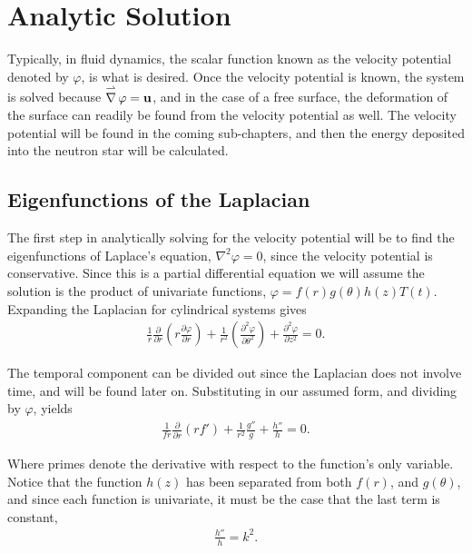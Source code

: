 \documentclass[12pt]{article}
\DeclareMathOperator{\grad}{\overset{\rightharpoonup}\nabla}
\begin{document}
\doublespacing
\linespread{2}

\section{Analytic Solution}

Typically, in fluid dynamics, the scalar function known as the velocity potential denoted by $\varphi$, is what is desired. Once the velocity potential is known, the system is solved because  $\grad \varphi = \bf{u}$, and in the case of a free surface, the deformation of the surface can readily be found from the velocity potential as well. The velocity potential will be found in the coming sub-chapters, and then the energy deposited into the neutron star will be calculated.

\subsection{Eigenfunctions of the Laplacian}

The first step in analytically solving for the velocity potential will be to find the eigenfunctions of Laplace's equation, $\nabla^2 \varphi = 0$, since the velocity potential is conservative. Since this is a partial differential equation we will assume the solution is the product of univariate functions, $\varphi = f(r) g(\theta) h(z) T(t)$. Expanding the Laplacian for cylindrical systems gives 
\begin{align*}
\frac{1}{r}\frac{\partial}{\partial r} \left( r \frac{\partial \varphi}{\partial r} \right) + \frac{1}{r^2} \left( \frac{\partial^2 \varphi}{\partial \theta^2} \right) + \frac{\partial^2 \varphi}{\partial z^2} = 0.
\end{align*}

The temporal component can be divided out since the Laplacian does not involve time, and will be found later on. Substituting in our assumed form, and dividing by $\varphi$, yields
\begin{align}
\label{eq:laplaciansub}
\frac{1}{fr}\frac{\partial}{\partial r}(rf') + \frac{1}{r^2}\frac{g''}{g} + \frac{h''}{h} = 0.
\end{align}

Where primes denote the derivative with respect to the function's only variable. Notice that the function $h(z)$ has been separated from both $f(r)$, and $g(\theta)$, and since each function is univariate, it must be the case that the last term is constant,
\begin{align*}
\frac{h''}{h} = k^2.
\end{align*}
\end{document}
